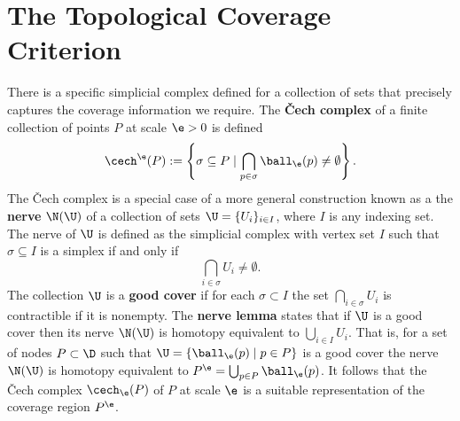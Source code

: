 \section{The Topological Coverage Criterion} %
\label{sec:tcc}

There is a specific simplicial complex defined for a collection of sets that precisely captures the coverage information we require.
The \textbf{\v Cech complex} of a finite collection of points $P$ at scale $\e > 0$ is defined
\[ \cech^\e(P) := \left\{\sigma \subseteq P\mid \bigcap_{p\in \sigma}\ball_\e(p)\neq \emptyset \right\}. \]
The \v Cech complex is a special case of a more general construction known as a the \textbf{nerve} $\N(\U)$ of a collection of sets $\U = \{U_i\}_{i\in I}$, where $I$ is any indexing set.
The nerve of $\U$ is defined as the simplicial complex with vertex set $I$ such that $\sigma\subseteq I$ is a simplex if and only if \[\bigcap_{i\in \sigma} U_i\neq \emptyset.\]
The collection $\U$ is a \textbf{good cover} if for each $\sigma\subset I$ the set $\bigcap_{i\in\sigma} U_i$ is contractible if it is nonempty.
The \textbf{nerve lemma} states that if $\U$ is a good cover then its nerve $\N(\U)$ is homotopy equivalent to $\bigcup_{i\in I} U_i$.
That is, for a set of nodes $P\subset\D$ such that $\U = \{\ball_\e(p)\mid p\in P\}$ is a good cover the nerve $\N(\U)$ is homotopy equivalent to $P^\e = \bigcup_{p\in P} \ball_\e(p)$.
It follows that the \v Cech complex $\cech_\e(P)$ of $P$ at scale $\e$ is a suitable representation of the coverage region $P^\e$.

